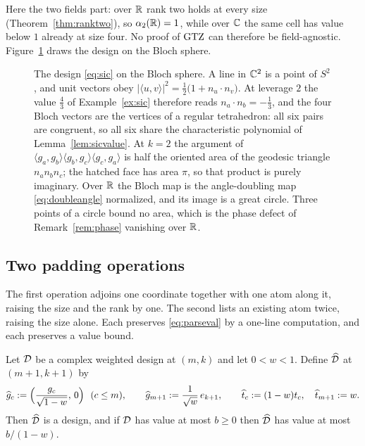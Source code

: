 Here the two fields part: over $\mathbb{R}$ rank two holds at every size
(Theorem~\ref{thm:ranktwo}), so $\alpha_2(\mathbb{R})=1$, while over $\mathbb{C}$ the
same cell has value below $1$ already at size four.  No proof of $\mathrm{GTZ}$
can therefore be field-agnostic.  Figure~\ref{fig:bloch} draws the design
on the Bloch sphere.

\begin{figure}[ht]
  \centering
  
  \caption{The design \eqref{eq:sic} on the Bloch sphere.  A line in $\mathbb{C}^{2}$
  is a point of $S^{2}$, and unit vectors obey
  $\lvert\langle u,v\rangle\rvert^{2}=\tfrac12\bigl(1+n_u\cdot n_v\bigr)$.  At
  leverage $2$ the value $\tfrac43$ of Example~\ref{ex:sic} therefore reads
  $n_a\cdot n_b=-\tfrac13$, and the four Bloch vectors are the vertices of a
  regular tetrahedron: all six pairs are congruent, so all six share the
  characteristic polynomial of Lemma~\ref{lem:sicvalue}.  At $k=2$ the argument
  of $\langle g_a,g_b\rangle\langle g_b,g_c\rangle\langle g_c,g_a\rangle$ is
  half the oriented area of the geodesic triangle $n_a n_b n_c$; the hatched
  face has area $\pi$, so that product is purely imaginary.  Over $\mathbb{R}$ the
  Bloch map is the angle-doubling map \eqref{eq:doubleangle} normalized, and
  its image is a great circle.  Three points of a circle bound no area, which
  is the phase defect of Remark~\ref{rem:phase} vanishing over $\mathbb{R}$.}
  \label{fig:bloch}
\end{figure}

\subsection{Two padding operations}\label{sec:cpadding}

The first operation adjoins one coordinate together with one atom along
it, raising the size and the rank by one.  The second lists an existing
atom twice, raising the size alone.  Each preserves \eqref{eq:parseval}
by a one-line computation, and each preserves a value bound.

\begin{lemma}[Lean]\label{lem:spike}
Let $\mathcal{D}$ be a complex weighted design at $(m,k)$ and let $0<w<1$.  Define
$\widehat{\mathcal{D}}$ at $(m+1,k+1)$ by
\[
  \widehat g_c:=\Bigl(\frac{g_c}{\sqrt{1-w}},\,0\Bigr)\ \ (c\le m),
  \qquad
  \widehat g_{m+1}:=\frac{1}{\sqrt w}\,e_{k+1},
  \qquad
  \widehat t_c:=(1-w)t_c,\quad \widehat t_{m+1}:=w .
\]
Then $\widehat{\mathcal{D}}$ is a design, and if $\mathcal{D}$ has value at most $b\ge0$ then
$\widehat{\mathcal{D}}$ has value at most $b/(1-w)$.
\end{lemma}

